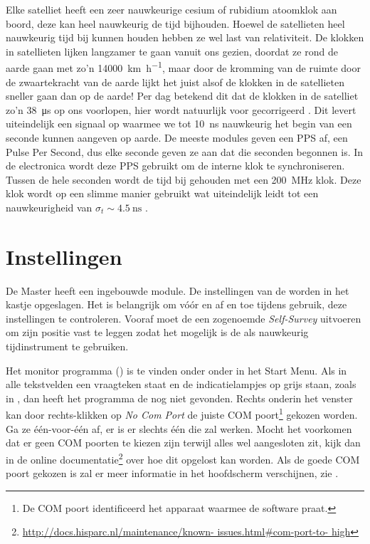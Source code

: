 Elke \gps satelliet heeft een zeer nauwkeurige cesium of rubidium
atoomklok aan boord, deze kan heel nauwkeurig de tijd bijhouden. Hoewel
de \gps satellieten heel nauwkeurig tijd bij kunnen houden hebben ze wel
last van relativiteit. De klokken in \gps satellieten lijken langzamer
te gaan vanuit ons gezien, doordat ze rond de aarde gaan met zo'n
\SI{14000}{\kilo\meter\per\hour}, maar door de kromming van de ruimte
door de zwaartekracht van de aarde lijkt het juist alsof de klokken in
de \gps satellieten sneller gaan dan op de aarde! Per dag betekend dit
dat de klokken in de satelliet zo'n \SI{38}{\micro\second} op ons
voorlopen, hier wordt natuurlijk voor gecorrigeerd \cite{ashby1997gen}.
Dit levert uiteindelijk een signaal op waarmee we tot
\SI{10}{\nano\second} nauwkeurig het begin van een seconde kunnen
aangeven op aarde. De meeste \gps modules geven een PPS af, een Pulse
Per Second, dus elke seconde geven ze aan dat die seconden begonnen is.
In de \hisparc electronica wordt deze PPS gebruikt om de interne klok te
synchroniseren. Tussen de hele seconden wordt de tijd bij gehouden met
een \SI{200}{\mega\hertz} klok. Deze klok wordt op een slimme manier
gebruikt wat uiteindelijk leidt tot een nauwkeurigheid van
$\sigma_t\sim\SI{4.5}{\nano\second}$ \cite{trimble2007res}.


\section{Instellingen}

De \hisparc Master heeft een ingebouwde \gps module. De instellingen van
de \gps worden in het kastje opgeslagen. Het is belangrijk om vóór en af
en toe tijdens gebruik, deze instellingen te controleren. Vooraf moet de
\gps een zogenoemde \emph{Self-Survey} uitvoeren om zijn positie vast te
leggen zodat het mogelijk is de \gps als nauwkeurig tijdinstrument te
gebruiken.

Het \gps monitor programma (\dspmon) is te vinden onder onder \hisparc
in het Start Menu. Als in alle tekstvelden een vraagteken staat en de
indicatielampjes op grijs staan, zoals in
, dan heeft het programma de \gps nog niet
gevonden. Rechts onderin het venster kan door rechts-klikken op \emph{No
Com Port} de juiste COM poort\footnote{De COM poort identificeerd het
apparaat waarmee de software praat.} gekozen worden. Ga ze één-voor-één
af, er is er slechts één die zal werken. Mocht het voorkomen dat er geen
COM poorten te kiezen zijn terwijl alles wel aangesloten zit, kijk dan
in de online
documentatie\footnote{\url{http://docs.hisparc.nl/maintenance/known-
issues.html#com-port-to- high}} over hoe dit opgelost kan worden. Als de
goede COM poort gekozen is zal er meer informatie in het hoofdscherm
verschijnen, zie .

